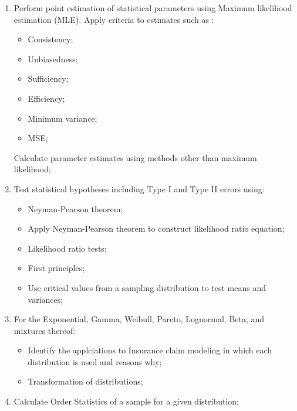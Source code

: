 \documentclass[12pt, titlepage, french]{report}
\begin{document}
\begin{outcomes}
\begin{enumerate}
	\item	Perform point estimation of statistical parameters using Maximum likelihood estimation (MLE). Apply criteria to estimates such as :
	\begin{multicols*}{2}
		\begin{itemize}
		\item	Consistency;
		\item	Unbiasedness;
		\item	Sufficiency;
		\item	Efficiency;
		\item	Minimum variance;
		\item	MSE;
		\end{itemize}
	\end{multicols*}
\tcbline
	Calculate parameter estimates using methods other than maximum likelihood;
	\item	Test statistical hypotheses including Type I and Type II errors using:
		\begin{itemize}
		\item	Neyman-Pearson theorem;
		\item[]	Apply Neyman-Pearson theorem to construct likelihood ratio equation;
		\item	Likelihood ratio tests;
		\item	First principles;
		\item[]	Use critical values from a sampling distribution to test means and variances;
		\end{itemize}
\tcbline
	\item	For the Exponential, Gamma, Weibull, Pareto, Lognormal, Beta, and mixtures thereof:
		\begin{itemize}
		\item	Identify the applciations to Insurance claim modeling in which each distribution is used and reasons why;
		\item	Transformation of distributions; 
		\end{itemize}
	\item	Calculate Order Statistics of a sample for a given distribution;
\end{enumerate}
\end{outcomes}
\end{document}
